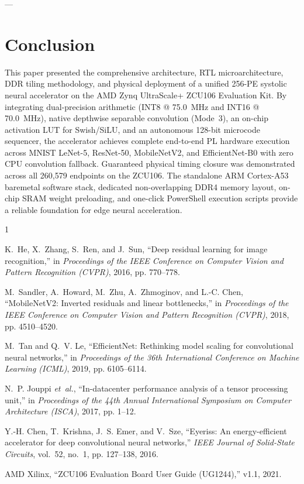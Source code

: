 \documentclass[10pt,journal,compsoc]{IEEEtran}
\begin{document}
---

\section{Conclusion}
This paper presented the comprehensive architecture, RTL microarchitecture, DDR tiling methodology, and physical deployment of a unified 256-PE systolic neural accelerator on the AMD Zynq UltraScale+ ZCU106 Evaluation Kit. By integrating dual-precision arithmetic (INT8 @ 75.0~MHz and INT16 @ 70.0~MHz), native depthwise separable convolution (Mode~3), an on-chip activation LUT for Swish/SiLU, and an autonomous 128-bit microcode sequencer, the accelerator achieves complete end-to-end PL hardware execution across MNIST LeNet-5, ResNet-50, MobileNetV2, and EfficientNet-B0 with zero CPU convolution fallback. Guaranteed physical timing closure was demonstrated across all 260,579 endpoints on the ZCU106. The standalone ARM Cortex-A53 baremetal software stack, dedicated non-overlapping DDR4 memory layout, on-chip SRAM weight preloading, and one-click PowerShell execution scripts provide a reliable foundation for edge neural acceleration.


\begin{thebibliography}{1}

K.~He, X.~Zhang, S.~Ren, and J.~Sun, ``Deep residual learning for image recognition,'' in \emph{Proceedings of the IEEE Conference on Computer Vision and Pattern Recognition (CVPR)}, 2016, pp. 770--778.

M.~Sandler, A.~Howard, M.~Zhu, A.~Zhmoginov, and L.-C. Chen, ``MobileNetV2: Inverted residuals and linear bottlenecks,'' in \emph{Proceedings of the IEEE Conference on Computer Vision and Pattern Recognition (CVPR)}, 2018, pp. 4510--4520.

M.~Tan and Q.~V. Le, ``EfficientNet: Rethinking model scaling for convolutional neural networks,'' in \emph{Proceedings of the 36th International Conference on Machine Learning (ICML)}, 2019, pp. 6105--6114.

N.~P. Jouppi \emph{et~al.}, ``In-datacenter performance analysis of a tensor processing unit,'' in \emph{Proceedings of the 44th Annual International Symposium on Computer Architecture (ISCA)}, 2017, pp. 1--12.

Y.-H. Chen, T.~Krishna, J.~S. Emer, and V.~Sze, ``Eyeriss: An energy-efficient accelerator for deep convolutional neural networks,'' \emph{IEEE Journal of Solid-State Circuits}, vol.~52, no.~1, pp. 127--138, 2016.

AMD Xilinx, ``ZCU106 Evaluation Board User Guide (UG1244),'' v1.1, 2021.

\end{thebibliography}
\end{document}

